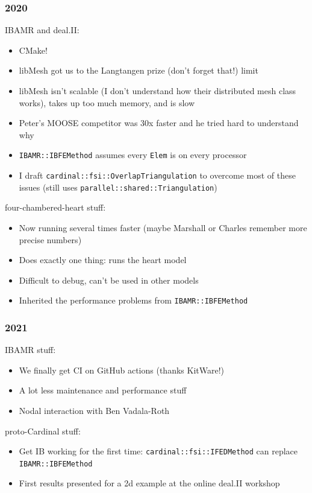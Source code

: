 \documentclass[8pt]{beamer}
\begin{document}
\begin{frame}
  \frametitle{2020}
  IBAMR and deal.II:
  \begin{itemize}
    \item[$\blacksquare$] CMake!
    \item[$\blacksquare$] libMesh got us to the Langtangen prize (don't forget that!)
      limit
    \item[$\blacksquare$] libMesh isn't scalable (I don't understand how their distributed mesh
      class works), takes up too much memory, and is slow
    \item[$\blacksquare$] Peter's MOOSE competitor was 30x faster and he tried hard to understand
      why
    \item[$\blacksquare$] \texttt{IBAMR::IBFEMethod} assumes every \texttt{Elem} is on every
      processor
    \item[$\blacksquare$] I draft \texttt{cardinal::fsi::OverlapTriangulation} to overcome most
      of these issues (still uses \texttt{parallel::shared::Triangulation})
  \end{itemize}
  \vfill

  four-chambered-heart stuff:
  \begin{itemize}
    \item[$\blacksquare$] Now running several times faster (maybe Marshall or Charles remember
      more precise numbers)
    \item[$\blacksquare$] Does exactly one thing: runs the heart model
    \item[$\blacksquare$] Difficult to debug, can't be used in other models
    \item[$\blacksquare$] Inherited the performance problems from \texttt{IBAMR::IBFEMethod}
  \end{itemize}
\end{frame}

\begin{frame}
  \frametitle{2021}
  IBAMR stuff:
  \begin{itemize}
    \item[$\blacksquare$] We finally get CI on GitHub actions (thanks KitWare!)
    \item[$\blacksquare$] A lot less maintenance and performance stuff
    \item[$\blacksquare$] Nodal interaction with Ben Vadala-Roth
  \end{itemize}
  \vfill

  proto-Cardinal stuff:
  \begin{itemize}
    \item[$\blacksquare$] Get IB working for the first time: \texttt{cardinal::fsi::IFEDMethod}
      can replace \texttt{IBAMR::IBFEMethod}
    \item[$\blacksquare$] First results presented for a 2d example at the online deal.II workshop
  \end{itemize}
\end{frame}
\end{document}
